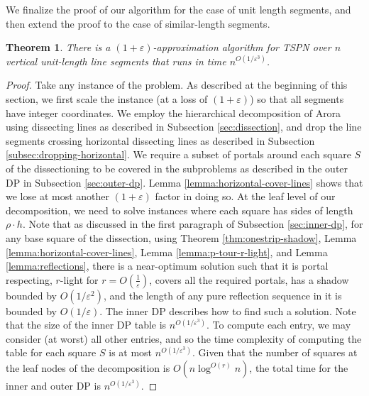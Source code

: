 \documentclass[10pt,a4paper]{amsart}
\theoremstyle{thmstyleone}
\newtheorem{theorem}{Theorem}
\newcommand{\eps}{\varepsilon}
\begin{document}
We finalize the proof of our algorithm for the case of unit length segments, and then extend the proof to the case of similar-length segments.

\begin{theorem}\label{thm:main2}
    There is a $ (1+\eps) $-approximation algorithm for TSPN over $ n $ vertical unit-length line segments that runs in time $n^{O(1/\eps^3)}$.
\end{theorem}

\begin{proof}
	Take any instance of the problem.
	As described at the beginning of this section,  we first scale the instance (at a loss of $(1+\eps)$)
	so that all segments have integer coordinates. We employ the hierarchical decomposition of Arora using dissecting lines
	as described in Subsection \ref{sec:dissection}, and drop the line segments crossing horizontal dissecting lines as described in Subsection \ref{subsec:dropping-horizontal}. We require a subset of
	portals around each square $ S $ of the dissectioning to be covered in the subproblems as described in the outer DP in Subsection \ref{sec:outer-dp}. Lemma \ref{lemma:horizontal-cover-lines} shows that we lose at most another $(1+\eps)$ factor in doing so. At the leaf level of our decomposition, we need to solve instances where
	each square has sides of length $\rho\cdot h$. Note that as discussed in the first paragraph of Subsection \ref{sec:inner-dp}, for any base square of the dissection, using Theorem \ref{thm:onestrip-shadow}, Lemma \ref{lemma:horizontal-cover-lines}, Lemma \ref{lemma:p-tour-r-light}, and Lemma \ref{lemma:reflections}, there is a near-optimum solution such that it is portal respecting, $r$-light for $ r = O(\frac1\eps) $, covers all the required portals, has a shadow bounded by $O(1/\eps^2)$, and the length
	of any pure reflection sequence in it is bounded by $O(1/\eps)$. The inner DP describes how to find such a solution. Note that the size of the inner DP table is $n^{O(1/\eps^3)}$. To compute each entry, we may consider (at worst) all other entries, and so the time complexity of computing the table for each
	square $S$ is at most $n^{O(1/\eps^3)}$. Given that the number of squares at the leaf nodes of the decomposition is $O(n\log^{O(r)} n)$, the total time for the inner and outer DP is $n^{O(1/\eps^3)}$.
\end{proof}

\end{document}
